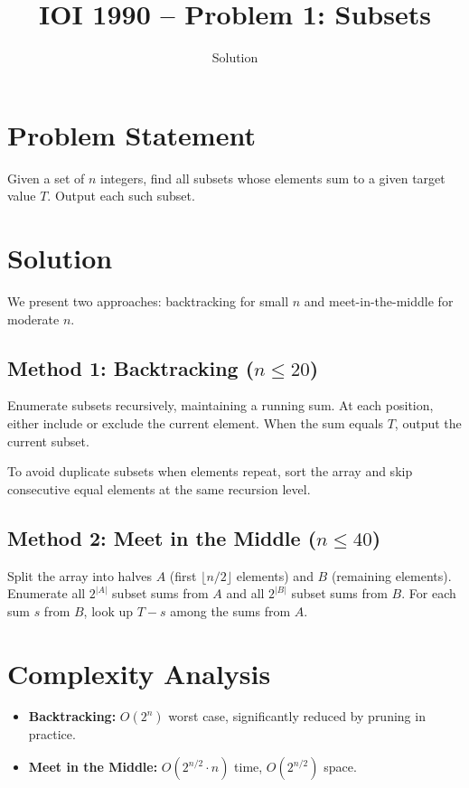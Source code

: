 \documentclass[11pt,a4paper]{article}
\title{IOI 1990 -- Problem 1: Subsets}
\author{Solution}
\date{}
\begin{document}
\maketitle

\section{Problem Statement}

Given a set of $n$ integers, find all subsets whose elements sum to a given
target value $T$. Output each such subset.

\section{Solution}

We present two approaches: backtracking for small $n$ and meet-in-the-middle
for moderate $n$.

\subsection{Method 1: Backtracking ($n \le 20$)}

Enumerate subsets recursively, maintaining a running sum. At each position,
either include or exclude the current element. When the sum equals $T$,
output the current subset.

To avoid duplicate subsets when elements repeat, sort the array and skip
consecutive equal elements at the same recursion level.

\subsection{Method 2: Meet in the Middle ($n \le 40$)}

Split the array into halves $A$ (first $\lfloor n/2 \rfloor$ elements) and
$B$ (remaining elements). Enumerate all $2^{|A|}$ subset sums from $A$ and
all $2^{|B|}$ subset sums from $B$. For each sum $s$ from $B$, look up
$T - s$ among the sums from $A$.

\section{Complexity Analysis}

\begin{itemize}
  \item \textbf{Backtracking:} $O(2^n)$ worst case, significantly reduced by
    pruning in practice.
  \item \textbf{Meet in the Middle:} $O(2^{n/2} \cdot n)$ time,
    $O(2^{n/2})$ space.
\end{itemize}
\end{document}
